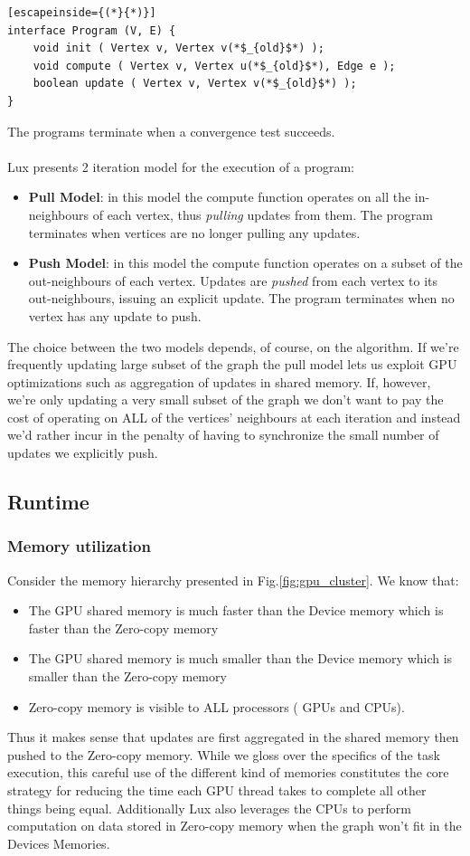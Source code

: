 \documentclass[]{article}
\begin{document}
\begin{lstlisting}[escapeinside={(*}{*)}]
interface Program (V, E) {
    void init ( Vertex v, Vertex v(*$_{old}$*) );
    void compute ( Vertex v, Vertex u(*$_{old}$*), Edge e );
    boolean update ( Vertex v, Vertex v(*$_{old}$*) );
}
\end{lstlisting}
The programs terminate when a convergence test succeeds.\\\\
Lux presents 2 iteration model for the execution of a program:
\begin{itemize}
	\item \textbf{Pull Model}: in this model the compute function operates on all the in-neighbours of each vertex, thus \textit{pulling} updates from them. The program terminates when vertices are no longer pulling any updates.
	\item \textbf{Push Model}: in this model the compute function operates on a subset of the out-neighbours of each vertex. Updates are \textit{pushed} from each vertex to its out-neighbours, issuing an explicit update. The program terminates when no vertex has any update to push.
\end{itemize}
The choice between the two models depends, of course, on the algorithm. If we're frequently updating large subset of the graph the pull model lets us exploit GPU optimizations such as aggregation of updates in shared memory. If, however, we're only updating a very small subset of the graph we don't want to pay the cost of operating on ALL of the vertices' neighbours at each iteration and instead we'd rather incur in the penalty of having to synchronize the small number of updates we explicitly push.

\subsection{Runtime}
\subsubsection{Memory utilization}
Consider the memory hierarchy presented in Fig.\ref{fig:gpu_cluster}. We know that:
\begin{itemize}
	\item The GPU shared memory is much faster than the Device memory which is faster than the Zero-copy memory
	\item The GPU shared memory is much smaller than the Device memory which is smaller than the Zero-copy memory
	\item Zero-copy memory is visible to ALL processors ( GPUs and CPUs).
\end{itemize}
Thus it makes sense that updates are first aggregated in the shared memory then pushed to the Zero-copy memory. While we gloss over the specifics of the task execution, this careful use of the different kind of memories constitutes the core strategy for reducing the time each GPU thread takes to complete all other things being equal. Additionally Lux also leverages the CPUs to perform computation on data stored in Zero-copy memory when the graph won't fit in the Devices Memories.
\end{document}
